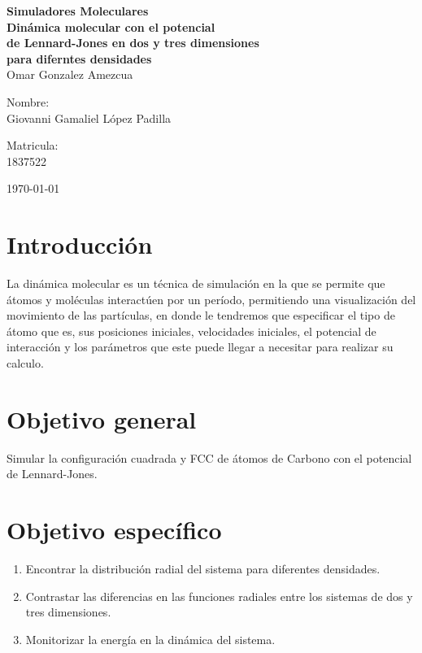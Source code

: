 \documentclass[reprint,amsmath,amssymb,aps,]{revtex4-2}
\begin{document}
\begin{titlepage}
\begin{center}
\begin{large}
\vspace{1cm}
\textbf{Simuladores Moleculares\vspace{0.5cm}\\
Dinámica molecular con el potencial \\ de Lennard-Jones en dos y tres dimensiones\\ para diferntes densidades}\\
Omar Gonzalez Amezcua\\
\end{large}
\vspace{3.5cm}
\begin{minipage}{0.6\linewidth}
\vspace{0.5cm}
\changefontsizes{14pt}
Nombre:\\
Giovanni Gamaliel López Padilla\\
\end{minipage}
\begin{minipage}{0.2\linewidth}
\changefontsizes{14pt}
Matricula:\\
1837522
\end{minipage}
\end{center}
\vspace{4cm}
\begin{flushright}
\today
\end{flushright}
\pagebreak
\end{titlepage}
\maketitle
\section{Introducción}
La dinámica molecular es un técnica de simulación en la que se permite que átomos y moléculas interactúen por un período,
 permitiendo una visualización del movimiento de las partículas, en donde le tendremos que especificar el tipo de átomo que es,
  sus posiciones iniciales, velocidades iniciales, el potencial de interacción y los parámetros que este puede llegar a necesitar 
  para realizar su calculo.\\
\section{Objetivo general}
Simular la configuración cuadrada y FCC de átomos de Carbono con el potencial de Lennard-Jones.
\section{Objetivo específico}
\begin{enumerate}
    \item Encontrar la distribución radial del sistema para diferentes densidades.
    \item Contrastar las diferencias en las funciones radiales entre los sistemas de dos y tres dimensiones.
    \item Monitorizar la energía en la dinámica del sistema.
\end{enumerate}
\end{document}
